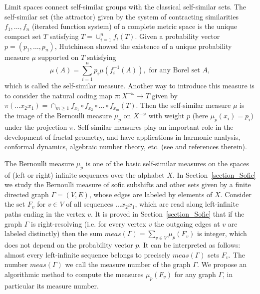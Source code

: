 \documentclass[12pt]{article}
\newcommand{\xmo}{X^{-\omega}}
\newcommand{\mgr}{meas}
\newcommand{\gr}{\Gamma}
\theoremstyle{definition}
\begin{document}
Limit spaces connect self-similar groups with the classical self-similar sets. The self-similar set
(the attractor) given by the system of contracting similarities $f_1,\ldots,f_n$ (iterated function
system) of a complete metric space is the unique compact set $T$ satisfying $T=\cup_{i=1}^n
f_i(T)$. Given a probability vector $p=(p_1,\ldots,p_n)$, Hutchinson
\cite{hutch:fract_self_similarity} showed the existence of a unique probability measure $\mu$
supported on $T$ satisfying
\begin{equation}\label{eqn_self_similar_measure}
\mu(A)=\sum_{i=1}^{n} p_i\mu(f_i^{-1}(A)), \mbox{ for any Borel set $A$},
\end{equation}
which is called the self-similar measure. Another way to introduce this measure is to consider the
natural coding map $\pi:\xmo\rightarrow T$ given by $\pi(\ldots x_2x_1)=\cap_{m\geq 1} f_{x_1}\circ
f_{x_2}\circ\ldots\circ f_{x_m}(T)$. Then the self-similar measure $\mu$ is the image of the
Bernoulli measure $\mu_p$ on $\xmo$ with weight $p$ (here $\mu_p(x_i)=p_i$) under the projection
$\pi$. Self-similar measures play an important role in the development of fractal geometry, and
have applications in harmonic analysis, conformal dynamics, algebraic number theory, etc. (see
\cite{edgar:int_prob_fr_mes,urb:meas_dim_confdyn, ifs_overl_self_sim_mes,str:self_harm,
bandt:self_sim_meas} and references therein).


The Bernoulli measure $\mu_p$ is one of the basic self-similar measures on the spaces of (left or
right) infinite sequences over the alphabet $X$. In Section~\ref{section_Sofic} we study the
Bernoulli measure of sofic subshifts and other sets given by a finite directed graph $\gr=(V,E)$,
whose edges are labeled by elements of $X$. Consider the set $F_v$ for $v\in V$ of all sequences
$\ldots x_2x_1$, which are read along left-infinite paths ending in the vertex $v$. It is proved in
Section~\ref{section_Sofic} that if the graph $\gr$ is right-resolving (i.e. for every vertex $v$
the outgoing edges at $v$ are labeled distinctly) then the sum $\mgr(\gr)=\sum_{v\in V} \mu_p(F_v)$
is integer, which does not depend on the probability vector $p$. It can be interpreted as follows:
almost every left-infinite sequence belongs to precisely $\mgr(\gr)$ sets $F_v$. The number
$\mgr(\gr)$ we call the measure number of the graph $\gr$. We propose an algorithmic method to
compute the measures $\mu_p(F_v)$ for any graph $\gr$, in particular its measure number.
\end{document}
